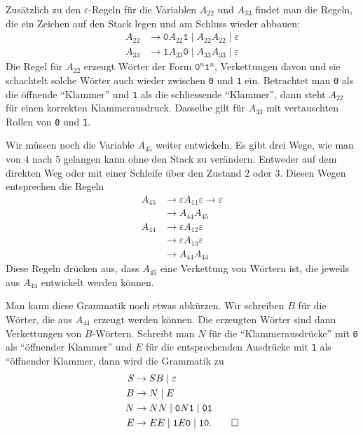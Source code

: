 \begin{loesung}
Zusätzlich zu den $\varepsilon$-Regeln für die Variablen $A_{22}$ und $A_{33}$
findet man die Regeln, die ein Zeichen auf den Stack legen und am
Schluss wieder abbauen:
\begin{align*}
A_{22}&\to \texttt{0}A_{22}\texttt{1} \;|\; A_{22}A_{22} \;|\; \varepsilon\\
A_{33}&\to \texttt{1}A_{33}\texttt{0} \;|\; A_{33}A_{33} \;|\; \varepsilon
\end{align*}
Die Regel für $A_{22}$ erzeugt Wörter der Form
$\texttt{0}^n\texttt{1}^n$,
Verkettungen davon und sie schachtelt solche Wörter auch wieder zwischen
\texttt{0} und \texttt{1} ein.
Betrachtet man \texttt{0} als die öffnende ``Klammer'' und \texttt{1}
als die schliessende ``Klammer'', dann steht $A_{22}$ für einen
korrekten Klammerausdruck.
Dasselbe gilt für $A_{33}$ mit vertauschten Rollen von \texttt{0}
und \texttt{1}.

Wir müssen noch die Variable $A_{45}$ weiter entwickeln. Es gibt
drei Wege, wie man von $4$ nach $5$ gelangen kann ohne den
Stack zu verändern. Entweder auf dem direkten Weg oder mit
einer Schleife über den Zustand $2$ oder $3$.
Diesen Wegen entsprechen die Regeln
\begin{align*}
A_{45}&\to\varepsilon A_{11}\varepsilon\to\varepsilon\\
      &\to A_{44}A_{45}\\
A_{44}&\to\varepsilon A_{12}\varepsilon\\
      &\to\varepsilon A_{13}\varepsilon\\
      &\to A_{44}A_{44}
\end{align*}
Diese Regeln drücken aus, dass $A_{45}$ eine Verkettung von Wörtern
ist, die jeweils aus $A_{44}$ entwickelt werden können.

Man kann diese Grammatik noch etwas abkürzen.
Wir schreiben $B$ für die Wörter, die aus $A_{44}$ erzeugt werden können.
Die erzeugten Wörter sind dann Verkettungen von $B$-Wörtern.
Schreibt man $N$ für die ``Klammerausdrücke'' mit \texttt{0} als ``öffnender 
Klammer'' und $E$ für die entsprechenden Ausdrücke mit \texttt{1}
als ``öffnender Klammer, dann wird die Grammatik zu
\begin{align*}
S&\to SB \;|\; \varepsilon
\\
B&\to N\;|\; E
\\
N&\to NN \;|\; \texttt{0}N\texttt{1} \;|\; \texttt{01}
\\
E&\to EE \;|\; \texttt{1}E\texttt{0} \;|\; \texttt{10}.
\qedhere
\end{align*}
\end{loesung}


